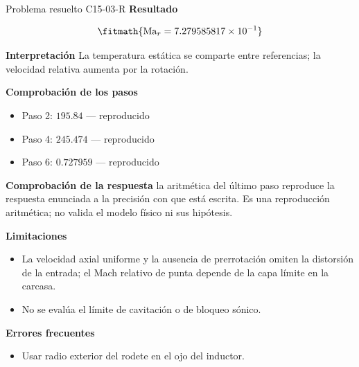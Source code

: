 \documentclass[10pt,openany]{book}
\begin{document}
\begin{studiumworked}{Problema resuelto C15-03-R}
\noindent\textbf{Resultado}

\[
\fitmath{\mathrm{Ma}_r=7.279585817\times10^{-1}}
\]

\noindent\textbf{Interpretación}
La temperatura estática se comparte entre referencias; la velocidad relativa aumenta por la rotación.

\noindent\textbf{Comprobación de los pasos}
\begin{itemize}
\item Paso 2: $195.84$ — reproducido
\item Paso 4: $245.474$ — reproducido
\item Paso 6: $0.727959$ — reproducido
\end{itemize}

\noindent\textbf{Comprobación de la respuesta} la aritmética del último paso reproduce la respuesta enunciada a la precisión con que está escrita. Es una reproducción aritmética; no valida el modelo físico ni sus hipótesis.

\noindent\textbf{Limitaciones}
\begin{itemize}
\item La velocidad axial uniforme y la ausencia de prerrotación omiten la distorsión de la entrada; el Mach relativo de punta depende de la capa límite en la carcasa.
\item No se evalúa el límite de cavitación o de bloqueo sónico.
\end{itemize}

\noindent\textbf{Errores frecuentes}
\begin{itemize}
\item Usar radio exterior del rodete en el ojo del inductor.
\end{itemize}
\end{studiumworked}
\end{document}
